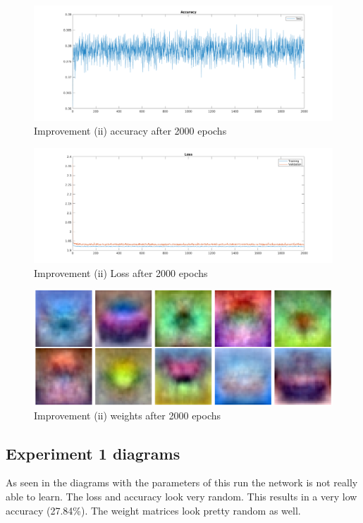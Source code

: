     \begin{figure}[ht]
        \includegraphics[width=\textwidth]{../code/result_pics/train_longer/2000_accuracy.png}
        \caption{Improvement (ii) accuracy after 2000 epochs}
        \label{fig:accuracyb}
    \end{figure}
    \begin{figure}[ht]
        \includegraphics[width=\textwidth]{../code/result_pics/train_longer/2000_loss.png}
        \caption{Improvement (ii) Loss after 2000 epochs}
        \label{fig:lossb}
    \end{figure}
    \begin{figure}[ht]
        \includegraphics[width=\textwidth]{../code/result_pics/train_longer/2000_weights.png}
        \caption{Improvement (ii) weights after 2000 epochs}
        \label{fig:weightsb}
    \end{figure}

\clearpage

\subsection{Experiment 1 diagrams}
As seen in the diagrams with the parameters of this run the network is not really able to learn. The loss and accuracy look very random. 
This results in a very low accuracy (27.84\%). The weight matrices look pretty random as well.

